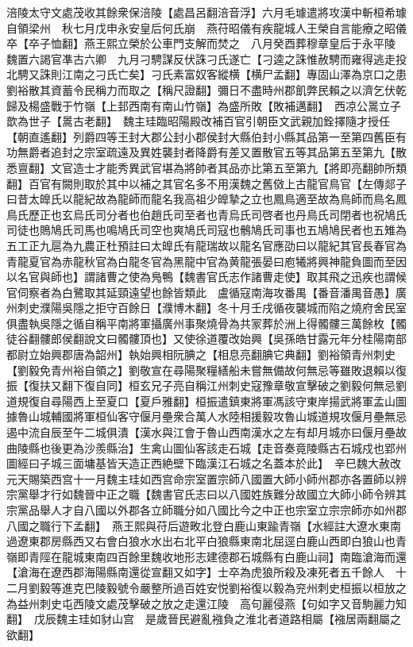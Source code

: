 涪陵太守文處茂收其餘衆保涪陵【處昌呂翻涪音浮】六月毛璩遣將攻漢中斬桓希璩自領梁州　秋七月戊申永安皇后何氏崩　燕苻昭儀有疾龍城人王榮自言能療之昭儀卒【卒子恤翻】燕王熙立榮於公車門支解而焚之　八月癸酉葬穆章皇后于永平陵　魏置六謁官凖古六卿　九月刁騁謀反伏誅刁氏遂亡【刁逵之誅惟赦騁而雍得逃走投北騁又誅則江南之刁氏亡矣】刁氏素富奴客縱横【横尸孟翻】專固山澤為京口之患劉裕散其資蓄令民稱力而取之【稱尺證翻】彌日不盡時州郡飢弊民賴之以濟乞伏乾歸及楊盛戰于竹嶺【上邽西南有南山竹嶺】為盛所敗【敗補邁翻】　西凉公暠立子歆為世子【暠古老翻】　魏主珪臨昭陽殿改補百官引朝臣文武親加銓擇隨才授任【朝直遙翻】列爵四等王封大郡公封小郡侯封大縣伯封小縣其品第一至第四舊臣有功無爵者追封之宗室疏遠及異姓襲封者降爵有差又置散官五等其品第五至第九【散悉亶翻】文官造士才能秀異武官堪為將帥者其品亦比第五至第九【將即亮翻帥所類翻】百官有闕則取於其中以補之其官名多不用漢魏之舊傚上古龍官鳥官【左傳郯子曰昔太皥氏以龍紀故為龍師而龍名我高祖少皥摯之立也鳳鳥適至故為鳥師而鳥名鳳鳥氏歷正也玄烏氏司分者也伯趙氏司至者也青烏氏司啓者也丹鳥氏司閉者也祝鳩氏司徒也鵙鳩氏司馬也鳴鳩氏司空也爽鳩氏司寇也鶻鳩氏司事也五鳩鳩民者也五雉為五工正九扈為九農正杜預註曰太皥氏有龍瑞故以龍名官應劭曰以龍紀其官長春官為青龍夏官為赤龍秋官為白龍冬官為黑龍中官為黄龍張晏曰庖犧將興神龍負圖而至因以名官與師也】謂諸曹之使為鳬鴨【魏書官氏志作諸曹走使】取其飛之迅疾也謂候官伺察者為白鷺取其延頸遠望也餘皆類此　盧循寇南海攻番禺【番音潘禺音愚】廣州刺史濮陽吳隱之拒守百餘日【濮博木翻】冬十月壬戌循夜襲城而陷之燒府舍民室俱盡執吳隱之循自稱平南將軍攝廣州事聚燒骨為共冡葬於洲上得髑髏三萬餘枚【髑徒谷翻髏郎侯翻說文曰髑髏頂也】又使徐道覆改始興【吳孫皓甘露元年分桂陽南部都尉立始興郡唐為韶州】執始興相阮腆之【相息亮翻腆它典翻】劉裕領青州刺史【劉毅免青州裕自領之】劉敬宣在尋陽聚糧繕船未嘗無備故何無忌等雖敗退賴以復振【復扶又翻下復自同】桓玄兄子亮自稱江州刺史寇豫章敬宣擊破之劉毅何無忌劉道規復自尋陽西上至夏口【夏戶雅翻】桓振遣鎮東將軍馮該守東岸揚武將軍孟山圖據魯山城輔國將軍桓仙客守偃月壘衆合萬人水陸相援毅攻魯山城道規攻偃月壘無忌遏中流自辰至午二城俱潰【漢水與江會于魯山西南漢水之左有却月城亦曰偃月壘故曲陵縣也後更為沙羨縣治】生禽山圖仙客該走石城【走音奏竟陵縣古石城戍也郢州圖經曰子城三面墉基皆天造正西絶壁下臨漢江石城之名蓋本於此】　辛巳魏大赦改元天賜築西宫十一月魏主珪如西宫命宗室置宗師八國置大師小師州郡亦各置師以辨宗黨舉才行如魏晉中正之職【魏書官氏志曰以八國姓族難分故國立大師小師令辨其宗黨品舉人才自八國以外郡各立師職分如八國比今之中正也宗室立宗宗師亦如州郡八國之職行下孟翻】　燕王熙與苻后遊畋北登白鹿山東踰青嶺【水經註大遼水東南過遼東郡房縣西又右會白狼水水出右北平白狼縣東南北屈逕白鹿山西即白狼山也青嶺即青陘在龍城東南四百餘里魏收地形志建德郡石城縣有白鹿山祠】南臨滄海而還【滄海在遼西郡海陽縣南還從宣翻又如字】士卒為虎狼所殺及凍死者五千餘人　十二月劉毅等進克巴陵毅號令嚴整所過百姓安悦劉裕復以毅為兖州刺史桓振以桓放之為益州刺史屯西陵文處茂擊破之放之走還江陵　高句麗侵燕【句如字又音駒麗力知翻】　戊辰魏主珪如豺山宫　是歲晉民避亂襁負之淮北者道路相屬【襁居兩翻屬之欲翻】

